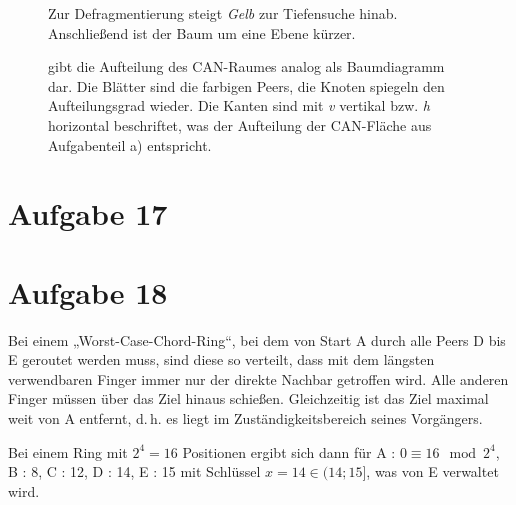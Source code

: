 \documentclass[10pt,a4paper]{article}
\begin{document}
\begin{figure}[h!]
\begin{multicols}{3}
\begin{flushleft}
\end{flushleft}

\begin{flushleft}Zur Defragmentierung steigt \textit{Gelb} zur Tiefensuche hinab. Anschließend ist der Baum um eine Ebene kürzer.
\end{flushleft}
\end{multicols}
\caption{gibt die Aufteilung des CAN-Raumes analog als Baumdiagramm dar. Die Blätter sind die farbigen Peers, die Knoten spiegeln den Aufteilungsgrad wieder. Die Kanten sind mit \textit{v} vertikal bzw. \textit{h} horizontal beschriftet, was der Aufteilung der CAN-Fläche aus Aufgabenteil a) entspricht.} \label{fig:4}
\end{figure}


\section*{Aufgabe 17}

\section*{Aufgabe 18}
Bei einem „Worst-Case-Chord-Ring“, bei dem von Start A durch alle Peers D bis E geroutet werden muss, sind diese so verteilt, dass mit dem längsten verwendbaren Finger immer nur der direkte Nachbar getroffen wird. Alle anderen Finger müssen über das Ziel hinaus schießen. Gleichzeitig ist das Ziel maximal weit von A entfernt, d.\,h. es liegt im Zuständigkeitsbereich seines Vorgängers.

Bei einem Ring mit $2^{4}=16$ Positionen ergibt sich dann für A : $0 \equiv 16\mod2^{4}$, B : 8, C : 12, D : 14, E : 15 mit Schlüssel $x=14 \in (14;15]$, was von E verwaltet wird.
\end{document}
